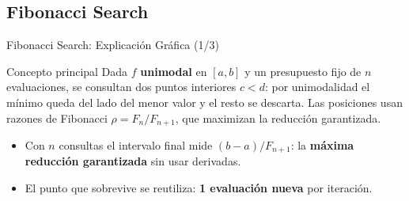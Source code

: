 \subsection{Fibonacci Search}

\begin{frame}{Fibonacci Search: Explicación Gráfica (1/3)}
    \begin{block}{Concepto principal}
        \footnotesize
        Dada $f$ \textbf{unimodal} en $[a,b]$ y un presupuesto fijo de $n$ evaluaciones,
        se consultan dos puntos interiores $c<d$: por unimodalidad el mínimo queda del
        lado del menor valor y el resto se descarta. Las posiciones usan razones de
        Fibonacci $\rho=F_n/F_{n+1}$, que maximizan la reducción garantizada.
    \end{block}

    \begin{center}
    \end{center}

    \scriptsize
    \begin{itemize}
        \item Con $n$ consultas el intervalo final mide $(b-a)/F_{n+1}$: la
              \textbf{máxima reducción garantizada} sin usar derivadas.
        \item El punto que sobrevive se reutiliza: \textbf{1 evaluación nueva} por iteración.
    \end{itemize}
\end{frame}

